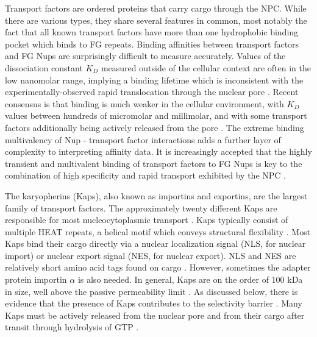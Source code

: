 Transport factors are ordered proteins that carry cargo through the NPC.  While there are various types, they share several features in common, most notably the fact that all known transport factors have more than one hydrophobic binding pocket which binds to FG repeats.  Binding affinities between transport factors and FG Nups are surprisingly difficult to measure accurately.  Values of the dissociation constant $K_D$ measured outside of the cellular context are often in the low nanomolar range, implying a binding lifetime which is inconsistent with the experimentally-observed rapid translocation through the nuclear pore \cite{pyhtila03, gilchrist02}.  Recent consensus is that binding is much weaker in the cellular environment, with $K_D$ values between hundreds of micromolar and millimolar, and with some transport factors additionally being actively released from the pore \cite{tetenbaum-novatt12-1, milles15, hayama18}.  The extreme binding multivalency of Nup - transport factor interactions adds a further layer of complexity to interpreting affinity data.  It is increasingly accepted that the highly transient and multivalent binding of transport factors to FG Nups is key to the combination of high specificity and rapid transport exhibited by the NPC \cite{jovanovic-talisman17}.

The karyopherins (Kaps), also known as importins and exportins, are the largest family of transport factors.  The approximately twenty different Kaps are responsible for most nucleocytoplasmic transport \cite{kapinos17}. Kaps typically consist of multiple HEAT repeats, a helical motif which conveys structural flexibility \cite{yoshimura16}.  Most Kaps bind their cargo directly via a nuclear localization signal (NLS, for nuclear import) or nuclear export signal (NES, for nuclear export).  NLS and NES are relatively short amino acid tags found on cargo \cite{chook11}.  However, sometimes the adapter protein importin $\alpha$ is also needed.    In general, Kaps are on the order of 100 kDa in size, well above the passive permeability limit \cite{timney16}.   As discussed below, there is evidence that the presence of Kaps contributes to the selectivity barrier \cite{kapinos18,kapinos17,schleicher14, kapinos14}.  Many Kaps must be actively released from the nuclear pore and from their cargo after transit through hydrolysis of GTP \cite{gorlich96,stewart07}.


